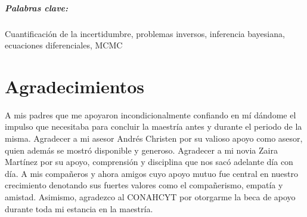 \documentclass[letterpaper,12pt,twoside]{book}  %
\begin{document}
\paragraph{Palabras clave:} Cuantificación de la incertidumbre, problemas inversos, inferencia bayesiana, ecuaciones diferenciales, MCMC

\chapter*{Agradecimientos}

A mis padres que me apoyaron incondicionalmente confiando en mí dándome el impulso que necesitaba para concluir la maestría antes y durante el periodo de la misma. Agradecer a mi asesor Andrés Christen por su valioso apoyo como asesor, quien además se mostró disponible y generoso. Agradecer a mi novia Zaira Martínez por su apoyo, comprensión y disciplina que nos sacó adelante día con día. A mis compañeros y ahora amigos cuyo apoyo mutuo fue central en nuestro crecimiento denotando sus fuertes valores como el compañerismo, empatía y amistad.
Asimismo, agradezco al CONAHCYT por otorgarme la beca de apoyo durante toda mi estancia en la maestría.

\tableofcontents

\listoffigures

\mainmatter















% 

\backmatter
\end{document}

